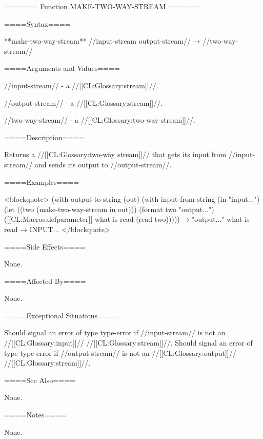 ====== Function MAKE-TWO-WAY-STREAM ======

====Syntax====

**make-two-way-stream** //input-stream output-stream// → //two-way-stream//

====Arguments and Values====

//input-stream// - a //[[CL:Glossary:stream]]//.

//output-stream// - a //[[CL:Glossary:stream]]//.

//two-way-stream// - a //[[CL:Glossary:two-way stream]]//.

====Description====

Returns a //[[CL:Glossary:two-way stream]]// that gets its input from //input-stream// and sends its output to //output-stream//.

====Examples====

<blockquote> (with-output-to-string (out) (with-input-from-string (in "input...") (let ((two (make-two-way-stream in out))) (format two "output...") ([[CL:Macros:defparameter]] what-is-read (read two))))) → "output..." what-is-read → INPUT... </blockquote>

====Side Effects====

None.

====Affected By====

None.

====Exceptional Situations====

Should signal an error of type type-error if //input-stream// is not an //[[CL:Glossary:input]]// //[[CL:Glossary:stream]]//. Should signal an error of type type-error if //output-stream// is not an //[[CL:Glossary:output]]// //[[CL:Glossary:stream]]//.

====See Also====

None.

====Notes====

None.

